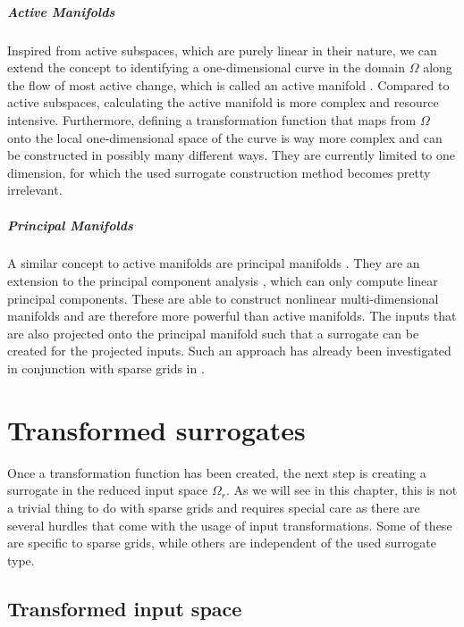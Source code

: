 \documentclass[
  a4paper,  %
  twoside,  %
  bibliography=totoc,
  headsepline,
  cleardoublepage=empty,
  parskip=half,
  draft=false
]{scrbook}
\begin{document}
\paragraph{Active Manifolds}
Inspired from active subspaces, which are purely linear in their nature, we can extend the concept to identifying a one-dimensional curve in the domain $\Omega$ along the flow of most active change, which is called an active manifold \cite{Bridges2019}.
Compared to active subspaces, calculating the active manifold is more complex and resource intensive.
Furthermore, defining a transformation function that maps from $\Omega$ onto the local one-dimensional space of the curve is way more complex and can be constructed in possibly many different ways.
They are currently limited to one dimension, for which the used surrogate construction method becomes pretty irrelevant.

\paragraph{Principal Manifolds}
A similar concept to active manifolds are principal manifolds \cite{Huo}.
They are an extension to the principal component analysis \cite{Abdi2010}, which can only compute linear principal components.
These are able to construct nonlinear multi-dimensional manifolds and are therefore more powerful than active manifolds.
The inputs that are also projected onto the principal manifold such that a surrogate can be created for the projected inputs.
Such an approach has already been investigated in conjunction with sparse grids in \cite{Feuersaenger2009}.

\chapter{Transformed surrogates}
\label{chap:c4}

Once a transformation function has been created, the next step is creating a surrogate in the reduced input space $\Omega_r$.
As we will see in this chapter, this is not a trivial thing to do with sparse grids and requires special care as there are several hurdles that come with the usage of input transformations.
Some of these are specific to sparse grids, while others are independent of the used surrogate type.

\section{Transformed input space}
\label{sec:tis}
\end{document}
